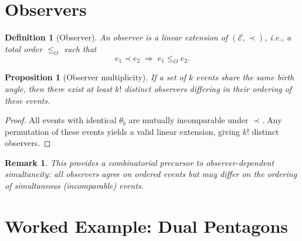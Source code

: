 \documentclass[12pt]{article}
\newtheorem{proposition}[theorem]{Proposition}
\newtheorem{definition}[theorem]{Definition}
\newtheorem{remark}[theorem]{Remark}
\newcommand{\Ecal}{\mathcal{E}}
\begin{document}
\section{Observers}\label{sec:observer}

\begin{definition}[Observer]\label{def:observer}
An \emph{observer} is a linear extension of $(\Ecal, \prec)$, i.e., a total order $\leq_O$ such that
\[
e_1 \prec e_2 \;\Rightarrow\; e_1 \leq_O e_2.
\]
\end{definition}

\begin{proposition}[Observer multiplicity]\label{prop:observers}
If a set of $k$ events share the same birth angle, then there exist at least $k!$ distinct observers differing in their ordering of these events.
\end{proposition}

\begin{proof}
All events with identical $\theta_b$ are mutually incomparable under $\prec$. Any permutation of these events yields a valid linear extension, giving $k!$ distinct observers.
\end{proof}

\begin{remark}
This provides a combinatorial precursor to observer-dependent simultaneity: all observers agree on ordered events but may differ on the ordering of simultaneous (incomparable) events.
\end{remark}

\section{Worked Example: Dual Pentagons}\label{sec:example}
\end{document}
